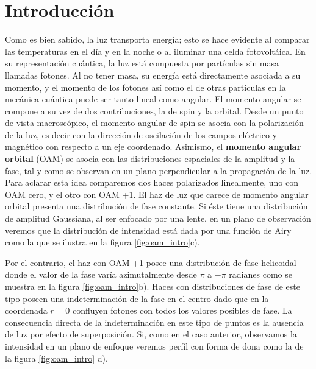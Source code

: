 


\chapter{Introducción}
\label{cha:Introduccion}
\graphicspath{{Figures/intro_img/}{../Figures/intro_img/}}

Como es bien sabido, la luz transporta energía; esto se hace evidente al
comparar las temperaturas en el día y en la noche o al iluminar una celda
fotovoltáica. En su representación cuántica, la luz está
compuesta por partículas sin masa llamadas fotones. Al no tener masa,
su energía está directamente asociada a su momento, y el momento de 
los fotones así como el de otras partículas en la mecánica cuántica puede ser tanto
lineal como angular. El momento angular se compone a su vez de dos
contribuciones, la de spin y la orbital. Desde un punto de vista 
macroscópico, el momento angular de spin se asocia con la polarización
de la luz, es decir con la dirección de oscilación de los campos
eléctrico y magnético con respecto a un eje coordenado. Asimismo, el
\textbf{momento angular orbital} (OAM) se asocia con las distribuciones
espaciales de la amplitud y la fase, tal y como se observan
en un plano perpendicular a la propagación de la luz. Para aclarar esta idea
comparemos dos haces polarizados linealmente, uno con OAM
cero, y el otro con OAM +1. El haz de luz que carece de momento
angular orbital presenta una distribución de fase constante. Si éste tiene una distribución de amplitud
Gaussiana, al ser enfocado por una lente, en un plano de
observación veremos que la distribución de intensidad está dada por una función de
Airy como la que se ilustra en la figura \ref{fig:oam_intro}c). 

 Por el contrario, el haz con OAM +1 posee una distribución
 de fase helicoidal donde el valor de la fase varía azimutalmente
 desde $\pi$ a $-\pi$ radianes como se muestra  
en la  figura  \ref{fig:oam_intro}b). Haces con distribuciones de fase de este tipo poseen una
indeterminación de la fase en el centro dado que en la
coordenada $r=0$ confluyen fotones con todos los valores posibles de fase. La
consecuencia directa de la indeterminación en este tipo de puntos es
la ausencia de luz por efecto de superposición. Si, como en el caso
anterior, observamos la intensidad en un plano de enfoque veremos
perfil con forma de dona como la de la figura
\ref{fig:oam_intro} d). 


